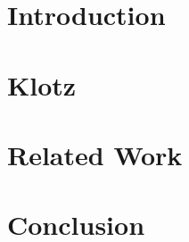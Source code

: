 \documentclass[runningheads]{llncs}
\newcommand{\seclabel}[1]{\label{sec:#1}}
\begin{document}

\section{Introduction} \seclabel{introduction}


\section{Klotz} \seclabel{klotz}


\section{Related Work} \seclabel{relatedwork}

\section{Conclusion} \seclabel{conclusion}



%



\end{document}
